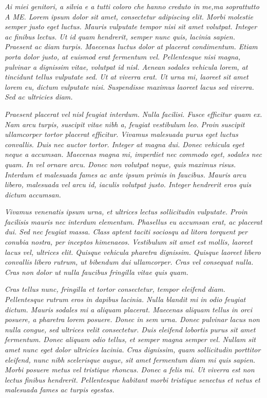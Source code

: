 \textit{Ai miei genitori, a silvia e a tutti coloro che hanno creduto in me,ma soprattutto A ME.
Lorem ipsum dolor sit amet, consectetur adipiscing elit. Morbi molestie semper justo eget luctus. Mauris vulputate tempor nisi sit amet volutpat. Integer ac finibus lectus. Ut id quam hendrerit, semper nunc quis, lacinia sapien. Praesent ac diam turpis. Maecenas luctus dolor at placerat condimentum. Etiam porta dolor justo, at euismod erat fermentum vel. Pellentesque nisi magna, pulvinar a dignissim vitae, volutpat id nisl. Aenean sodales vehicula lorem, at tincidunt tellus vulputate sed. Ut at viverra erat. Ut urna mi, laoreet sit amet lorem eu, dictum vulputate nisi. Suspendisse maximus laoreet lacus sed viverra. Sed ac ultricies diam.}

\textit{Praesent placerat vel nisl feugiat interdum. Nulla facilisi. Fusce efficitur quam ex. Nam arcu turpis, suscipit vitae nibh a, feugiat vestibulum leo. Proin suscipit ullamcorper tortor placerat efficitur. Vivamus malesuada purus eget luctus convallis. Duis nec auctor tortor. Integer at magna dui. Donec vehicula eget neque a accumsan. Maecenas magna mi, imperdiet nec commodo eget, sodales nec quam. In vel ornare arcu. Donec non volutpat neque, quis maximus risus. Interdum et malesuada fames ac ante ipsum primis in faucibus. Mauris arcu libero, malesuada vel arcu id, iaculis volutpat justo. Integer hendrerit eros quis dictum accumsan.}

\textit{Vivamus venenatis ipsum urna, et ultrices lectus sollicitudin vulputate. Proin facilisis mauris nec interdum elementum. Phasellus eu accumsan erat, ac placerat dui. Sed nec feugiat massa. Class aptent taciti sociosqu ad litora torquent per conubia nostra, per inceptos himenaeos. Vestibulum sit amet est mollis, laoreet lacus vel, ultrices elit. Quisque vehicula pharetra dignissim. Quisque laoreet libero convallis libero rutrum, ut bibendum dui ullamcorper. Cras vel consequat nulla. Cras non dolor ut nulla faucibus fringilla vitae quis quam.}

\textit{Cras tellus nunc, fringilla et tortor consectetur, tempor eleifend diam. Pellentesque rutrum eros in dapibus lacinia. Nulla blandit mi in odio feugiat dictum. Mauris sodales mi a aliquam placerat. Maecenas aliquam tellus in orci posuere, a pharetra lorem posuere. Donec in sem urna. Donec pulvinar lacus non nulla congue, sed ultrices velit consectetur. Duis eleifend lobortis purus sit amet fermentum. Donec aliquam odio tellus, et semper magna semper vel. Nullam sit amet nunc eget dolor ultricies lacinia. Cras dignissim, quam sollicitudin porttitor eleifend, nunc nibh scelerisque augue, sit amet fermentum diam mi quis sapien. Morbi posuere metus vel tristique rhoncus. Donec a felis mi. Ut viverra est non lectus finibus hendrerit. Pellentesque habitant morbi tristique senectus et netus et malesuada fames ac turpis egestas.}

